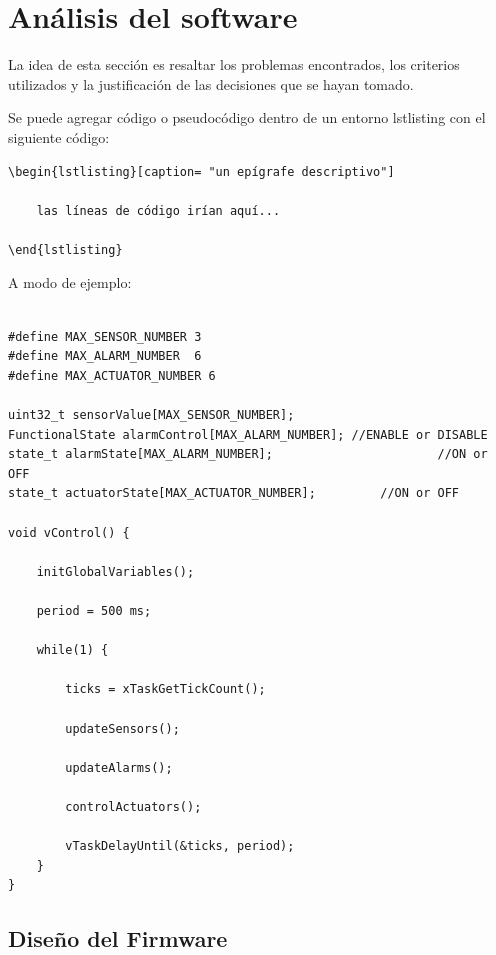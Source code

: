\section{Análisis del software}
 
La idea de esta sección es resaltar los problemas encontrados, los criterios utilizados y la justificación de las decisiones que se hayan tomado.

Se puede agregar código o pseudocódigo dentro de un entorno lstlisting con el siguiente código:

\begin{verbatim}
\begin{lstlisting}[caption= "un epígrafe descriptivo"]

	las líneas de código irían aquí...
	
\end{lstlisting}
\end{verbatim}

A modo de ejemplo:

\begin{lstlisting}[caption=Pseudocódigo del lazo principal de control.]  % Start your code-block

#define MAX_SENSOR_NUMBER 3
#define MAX_ALARM_NUMBER  6
#define MAX_ACTUATOR_NUMBER 6

uint32_t sensorValue[MAX_SENSOR_NUMBER];		
FunctionalState alarmControl[MAX_ALARM_NUMBER];	//ENABLE or DISABLE
state_t alarmState[MAX_ALARM_NUMBER];						//ON or OFF
state_t actuatorState[MAX_ACTUATOR_NUMBER];			//ON or OFF

void vControl() {

	initGlobalVariables();
	
	period = 500 ms;
		
	while(1) {

		ticks = xTaskGetTickCount();
		
		updateSensors();
		
		updateAlarms();
		
		controlActuators();
		
		vTaskDelayUntil(&ticks, period);
	}
}
\end{lstlisting}

\subsection{Diseño del Firmware}

